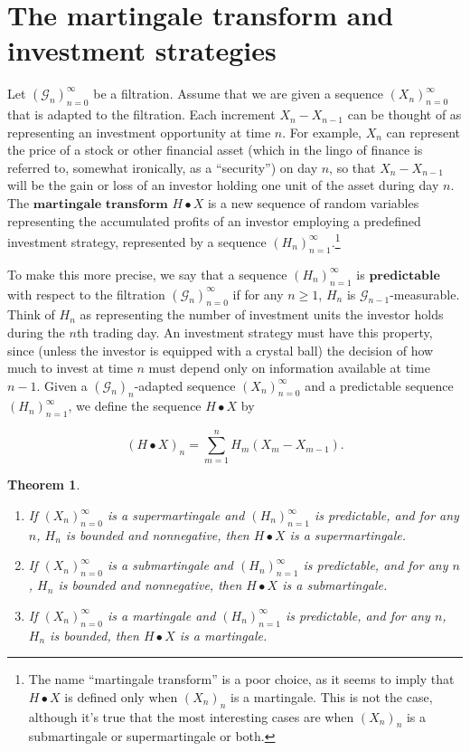 \documentclass[11pt]{report}
\theoremstyle{plain}
\newtheorem{thm}{Theorem}[chapter]
\theoremstyle{definition}
\begin{document}
\section{The martingale transform and investment strategies}
Let $(\mathcal{G}_n)_{n=0}^\infty$ be a filtration. Assume that we are given a sequence $(X_n)_{n=0}^\infty$ that is adapted to the filtration. Each increment $X_n-X_{n-1}$ can be thought of as representing an investment opportunity at time $n$. For example, $X_n$ can represent the price of a stock or other financial asset (which in the lingo of finance is referred to, somewhat  ironically, as a ``security'') on day $n$, so that $X_n-X_{n-1}$ will be the gain or loss of an investor holding one unit of the asset during day $n$. The $\textbf{martingale transform}$ $H\bullet X$ is a new sequence of random variables representing the accumulated profits of an investor employing a predefined investment strategy, represented by a sequence $(H_n)_{n=1}^\infty$.\footnote{The name ``martingale transform'' is a poor choice, as it seems to imply that $H\bullet X$ is defined only when $(X_n)_n$ is a martingale. This is not the case, although it's true that the most interesting cases are when $(X_n)_n$ is a submartingale or supermartingale or both.}

To make this more precise, we say that a sequence $(H_n)_{n=1}^\infty$ is $\textbf{predictable}$ with respect to the filtration $(\mathcal{G}_n)_{n=0}^\infty$ if for any $n\ge 1$, $H_n$ is $\mathcal{G}_{n-1}$-measurable. Think of $H_n$ as representing the number of investment units the investor holds during the $n$th trading day. An investment strategy must have this property, since (unless the investor is equipped with a crystal ball) the decision of how much to invest at time $n$ must depend only on information available at time $n-1$. Given a $(\mathcal{G}_n)_n$-adapted sequence $(X_n)_{n=0}^\infty$ and a predictable sequence $(H_n)_{n=1}^\infty$, we define the sequence $H\bullet X$ by

\[
(H\bullet X)_n = \sum_{m=1}^n H_m(X_m-X_{m-1}).
\]

\begin{thm}
\label{thm-marting-transform}

\begin{enumerate}[label=\arabic*.]
\item If $(X_n)_{n=0}^\infty$ is a supermartingale and $(H_n)_{n=1}^\infty$ is predictable, and for any $n$, $H_n$ is bounded and nonnegative, then $H\bullet X$ is a supermartingale.
\item If $(X_n)_{n=0}^\infty$ is a submartingale and $(H_n)_{n=1}^\infty$ is predictable, and for any $n$, $H_n$ is bounded and nonnegative, then $H\bullet X$ is a submartingale.
\item If $(X_n)_{n=0}^\infty$ is a martingale and $(H_n)_{n=1}^\infty$ is predictable, and for any $n$, $H_n$ is bounded, then $H\bullet X$ is a martingale.
\end{enumerate}

\end{thm}
\end{document}

